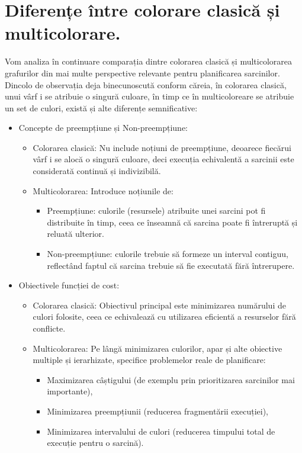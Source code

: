 \section{Diferențe între colorare clasică și multicolorare.}
 Vom analiza în continuare comparația dintre colorarea clasică și multicolorarea grafurilor din mai multe perspective relevante pentru planificarea sarcinilor. Dincolo de observația deja binecunoscută conform căreia, în colorarea clasică, unui vârf i se atribuie o singură culoare, în timp ce în multicoloreare se atribuie un set de culori, există și alte diferențe semnificative:
 \begin{itemize}
  \item Concepte de preempțiune și Non-preempțiune:
  \begin{itemize}
    \item Colorarea clasică:  Nu include noțiuni de preempțiune, deoarece fiecărui vârf i se alocă o singură culoare, deci execuția echivalentă a sarcinii este considerată continuă și indivizibilă.
    \item Multicolorarea: Introduce noțiunile de: 
    \begin{itemize}
      \item Preempțiune: culorile (resursele) atribuite unei sarcini pot fi distribuite în timp, ceea ce înseamnă că sarcina poate fi întreruptă și reluată ulterior.
      \item Non-preempțiune:  culorile trebuie să formeze un interval contiguu, reflectând faptul că sarcina trebuie să fie executată fără întrerupere.
    \end{itemize}
    \end{itemize}
    \item Obiectivele funcției de cost:
    \begin{itemize}
      \item Colorarea clasică: Obiectivul principal este minimizarea numărului de culori folosite, ceea ce echivalează cu utilizarea eficientă a resurselor fără conflicte.
      \item Multicolorarea: Pe lângă minimizarea culorilor, apar și alte obiective multiple și ierarhizate, specifice problemelor reale de planificare:
      \begin{itemize}
        \item Maximizarea câștigului (de exemplu prin prioritizarea sarcinilor mai importante),
        \item Minimizarea preempțiunii (reducerea fragmentării execuției),
        \item Minimizarea intervalului de culori (reducerea timpului total de execuție pentru o sarcină).
      \end{itemize} 
    \end{itemize}   
  

\end{itemize}
